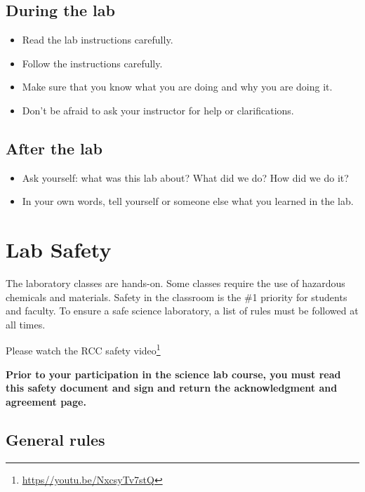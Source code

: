 \documentclass[]{book}
\providecommand{\tightlist}{%
  \setlength{\itemsep}{0pt}\setlength{\parskip}{0pt}}
\let\rmarkdownfootnote\footnote%
\def\footnote{\protect\rmarkdownfootnote}
\renewcommand{\href}[2]{#2\footnote{\url{#1}}}
\theoremstyle{definition}
\theoremstyle{definition}
\theoremstyle{definition}
\theoremstyle{remark}
\let\BeginKnitrBlock\begin \let\EndKnitrBlock\end
\begin{document}
\section*{During the lab}\label{during-the-lab}

\begin{itemize}
\tightlist
\item
  Read the lab instructions carefully.
\item
  Follow the instructions carefully.
\item
  Make sure that you know what you are doing and why you are doing it.
\item
  Don't be afraid to ask your instructor for help or clarifications.
\end{itemize}

\section*{After the lab}\label{after-the-lab}

\begin{itemize}
\tightlist
\item
  Ask yourself: what was this lab about? What did we do? How did we do
  it?
\item
  In your own words, tell yourself or someone else what you learned in
  the lab.
\end{itemize}

\chapter{Lab Safety}\label{lab-safety}

The laboratory classes are hands-on. Some classes require the use of
hazardous chemicals and materials. Safety in the classroom is the \#1
priority for students and faculty. To ensure a safe science laboratory,
a list of rules must be followed at all times.

Please watch the \href{https//youtu.be/NxcsyTv7stQ}{RCC safety video}

\BeginKnitrBlock{rmdimportant}
\textbf{Prior to your participation in the science lab course, you must
read this safety document and sign and return the acknowledgment and
agreement page.}
\EndKnitrBlock{rmdimportant}

\section{General rules}\label{general-rules}
\end{document}

